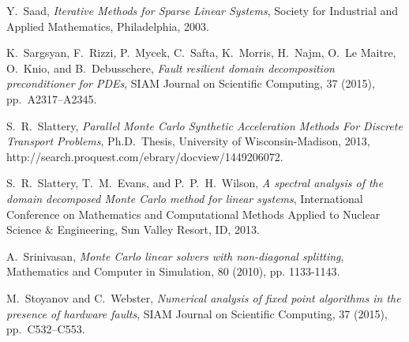 \documentclass[times]{nlaauth}
\begin{document}
\begin{thebibliography}{99}
 {\sc Y.~Saad},
 {\em Iterative Methods for Sparse Linear Systems},
 Society for Industrial and Applied Mathematics, Philadelphia, 2003.

  {\sc K.~Sargsyan, F.~Rizzi, P.~Mycek, C.~Safta, K.~Morris, H.~Najm,
  O.~Le Maitre, O.~Knio, and B.~Debusschere},
  {\em Fault resilient domain decomposition preconditioner for PDEs},
  SIAM Journal on Scientific Computing,
  37 (2015), pp.~A2317--A2345.

 {\sc S.~R.~Slattery},
 {\em Parallel Monte Carlo Synthetic Acceleration Methods For Discrete
Transport Problems},
 Ph.D.~Thesis, University of Wisconsin-Madison, 2013,
http://search.proquest.com/ebrary/docview/1449206072.

 {\sc S.~R.~Slattery, T.~M.~Evans, and P.~P.~H.~Wilson},
 {\em A spectral analysis of the domain decomposed Monte Carlo method for
linear systems},
 International Conference on Mathematics and Computational Methods
Applied to Nuclear Science \& Engineering, Sun Valley Resort, ID, 2013.

 {\sc A.~Srinivasan},
 {\em Monte Carlo linear solvers with non-diagonal splitting},
 Mathematics and Computer in Simulation,
 80 (2010), pp. 1133-1143.

 {\sc M.~Stoyanov and C.~Webster},
 {\em Numerical analysis of fixed point algorithms in the presence of hardware
  faults},
  SIAM Journal on Scientific Computing,
  37 (2015), pp.~C532--C553.

\end{thebibliography}
\end{document}
